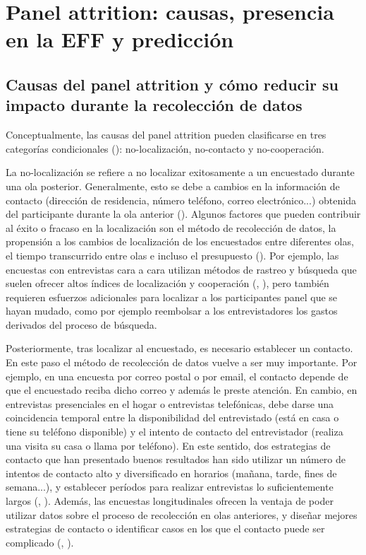 \chapter{Panel attrition: causas, presencia en la EFF y predicción}
\label{chapter:attrition}
\section{Causas del panel attrition y cómo reducir su impacto durante la recolección de datos}

Conceptualmente, las causas del panel attrition pueden clasificarse en tres categorías condicionales (\cite{lepkowski2002nonresponse}): no-localización, no-contacto y no-cooperación.

La no-localización se refiere a no localizar exitosamente a un encuestado durante una ola posterior. Generalmente, esto se debe a cambios en la información de contacto (dirección de residencia, número teléfono, correo electrónico...) obtenida del participante durante la ola anterior (\cite{couper2009keeping}). Algunos factores que pueden contribuir al éxito o fracaso en la localización son el método de recolección de datos, la propensión a los cambios de localización de los encuestados entre diferentes olas, el tiempo transcurrido entre olas e incluso el presupuesto (\cite{lynn2009methods}). Por ejemplo, las encuestas con entrevistas cara a cara utilizan métodos de rastreo y búsqueda que suelen ofrecer altos índices de localización y cooperación (\cite{de2005mix}, \cite{couper2009keeping}), pero también requieren esfuerzos adicionales para localizar a los participantes panel que se hayan mudado, como por ejemplo reembolsar a los entrevistadores los gastos derivados del proceso de búsqueda.

Posteriormente, tras localizar al encuestado, es necesario establecer un contacto. En este paso el método de recolección de datos vuelve a ser muy importante. Por ejemplo, en una encuesta por correo postal o por email, el contacto depende de que el encuestado reciba dicho correo y además le preste atención. En cambio, en entrevistas presenciales en el hogar o entrevistas telefónicas, debe darse una coincidencia temporal entre la disponibilidad del entrevistado (está en casa o tiene su teléfono disponible) y el intento de contacto del entrevistador (realiza una visita su casa o llama por teléfono). En este sentido, dos estrategias de contacto que han presentado buenos resultados han sido utilizar un número de intentos de contacto alto y diversificado en horarios (mañana, tarde, fines de semana...), y establecer períodos para realizar entrevistas lo suficientemente largos (\cite{nicoletti2005survey}, \cite{watson2009identifying}). Además, las encuestas longitudinales ofrecen la ventaja de poder utilizar datos sobre el proceso de recolección en olas anteriores, y diseñar mejores estrategias de contacto o identificar casos en los que el contacto puede ser complicado (\cite{calderwood2012using}, \cite{lagorio2016call}).

